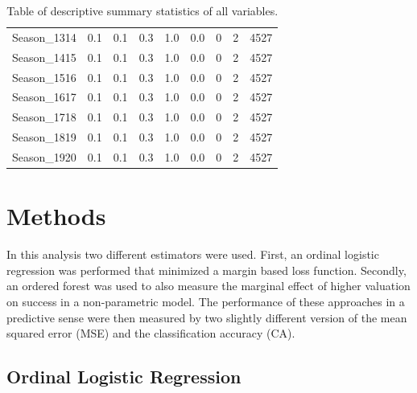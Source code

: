 \documentclass[11pt]{article}
\begin{document}
\begin{table}[h!]
{\begin{tabular}{lrrrrrrrr}
				Season\_1314    &    0.1 &    0.1 &   0.3 &    1.0 &    0.0 &        0 &       2 &   4527 \\
				Season\_1415    &    0.1 &    0.1 &   0.3 &    1.0 &    0.0 &        0 &       2 &   4527 \\
				Season\_1516    &    0.1 &    0.1 &   0.3 &    1.0 &    0.0 &        0 &       2 &   4527 \\
				Season\_1617    &    0.1 &    0.1 &   0.3 &    1.0 &    0.0 &        0 &       2 &   4527 \\
				Season\_1718    &    0.1 &    0.1 &   0.3 &    1.0 &    0.0 &        0 &       2 &   4527 \\
				Season\_1819    &    0.1 &    0.1 &   0.3 &    1.0 &    0.0 &        0 &       2 &   4527 \\
				Season\_1920    &    0.1 &    0.1 &   0.3 &    1.0 &    0.0 &        0 &       2 &   4527 \\
				\bottomrule
			\end{tabular}}
		\caption{Table of descriptive summary statistics of all variables.}
		\label{tab:SummaryStatTab}
\end{table}



\section{Methods}

In this analysis two different estimators were used. First, an ordinal logistic regression was performed that minimized a margin based loss function. Secondly, an ordered forest was used to also measure the marginal effect of higher valuation on success in a non-parametric model. The performance of these approaches in a predictive sense were then measured by two slightly different version of the mean squared error (MSE) and the classification accuracy (CA).


\subsection{Ordinal Logistic Regression}
\end{document}
